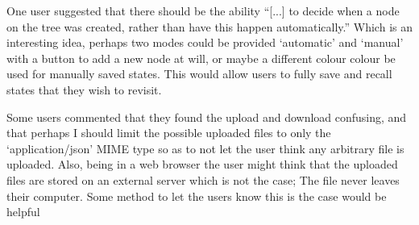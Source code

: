One user suggested that there should be the ability ``[...] to decide when a
node on the tree was created, rather than have this happen automatically.''
Which is an interesting idea, perhaps two modes could be provided `automatic'
and `manual' with a button to add a new node at will, or maybe a different
colour colour be used for manually saved states. This would allow users to fully
save and recall states that they wish to revisit.

Some users commented that they found the upload and download confusing, and that
perhaps I should limit the possible uploaded files to only the
`application/json' MIME type so as to not let the user think any arbitrary file
is uploaded. Also, being in a web browser the user might think that the
uploaded files are stored on an external server which is not the case; The file
never leaves their computer. Some method to let the users know this is the case
would be helpful

